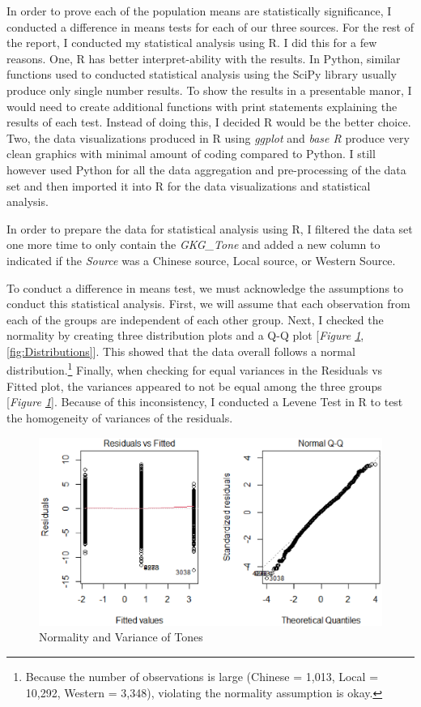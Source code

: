 \documentclass[12pt]{article}
\begin{document}
In order to prove each of the population means are statistically significance, I conducted a difference in means tests for each of our three sources. For the rest of the report, I conducted my statistical analysis using R. I did this for a few reasons. One, R has better interpret-ability with the results. In Python, similar functions used to conducted statistical analysis using the SciPy library usually produce only single number results. To show the results in a presentable manor, I would need to create additional functions with print statements explaining the results of each test. Instead of doing this, I decided R would be the better choice. Two, the data visualizations produced in R using \textit{ggplot} and \textit{base R} produce very clean graphics with minimal amount of coding compared to Python. I still however used Python for all the data aggregation and pre-processing of the data set and then imported it into R for the data visualizations and statistical analysis.

In order to prepare the data for statistical analysis using R, I filtered the data set one more time to only contain the \textit{GKG\_Tone} and added a new column to indicated if the \textit{Source} was a Chinese source, Local source, or Western Source.

To conduct a difference in means test, we must acknowledge the assumptions to conduct this statistical analysis. First, we will assume that each observation from each of the groups are independent of each other group. Next, I checked the normality by creating three distribution plots and a Q-Q plot [\textit{Figure \ref{fig:Normality}}, \ref{fig:Distributions}]. This showed that the data overall follows a normal distribution.\renewcommand{\thefootnote}{\roman{footnote}}\footnote{Because the number of observations is large (Chinese = 1,013, Local = 10,292, Western = 3,348), violating the normality assumption is okay.} Finally, when checking for equal variances in the Residuals vs Fitted plot, the variances appeared to not be equal among the three groups [\textit{Figure \ref{fig:Normality}}]. Because of this inconsistency, I conducted a Levene Test in R to test the homogeneity of variances of the residuals.

\begin{figure}
	\centering
	\includegraphics[width=\textwidth]{Normality R.eps}
	\caption{Normality and Variance of Tones}
    \label{fig:Normality}
\end{figure}
\end{document}
